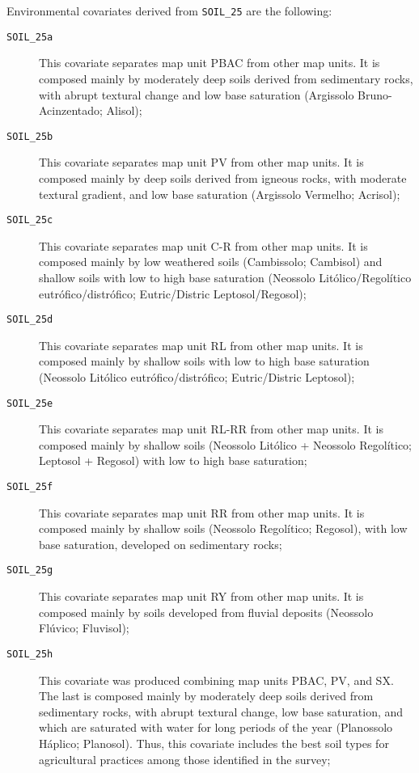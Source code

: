 Environmental covariates derived from \texttt{SOIL\_25} are the following:

\begin{description}
  \item[\texttt{SOIL\_25a}] This covariate separates map unit PBAC from other map units. It is composed mainly by moderately deep soils derived from sedimentary rocks, with abrupt textural change and low base saturation (Argissolo Bruno-Acinzentado; Alisol);

  \item[\texttt{SOIL\_25b}] This covariate separates map unit PV from other map units. It is composed mainly by deep soils derived from igneous rocks, with moderate textural gradient, and low base saturation (Argissolo Vermelho; Acrisol);
 
  \item[\texttt{SOIL\_25c}] This covariate separates map unit C-R from other map units. It is composed mainly by low weathered soils (Cambissolo; Cambisol) and shallow soils with low to high base saturation (Neossolo Litólico/Regolítico eutrófico/distrófico; Eutric/Distric Leptosol/Regosol);
 
  \item[\texttt{SOIL\_25d}] This covariate separates map unit RL from other map units. It is composed mainly by shallow soils with low to high base saturation (Neossolo Litólico eutrófico/distrófico; Eutric/Distric Leptosol);
 
  \item[\texttt{SOIL\_25e}] This covariate separates map unit RL-RR from other map units. It is composed mainly by shallow soils (Neossolo Litólico + Neossolo Regolítico; Leptosol + Regosol) with low to high base saturation;
 
  \item[\texttt{SOIL\_25f}] This covariate separates map unit RR from other map units. It is composed mainly by shallow soils (Neossolo Regolítico; Regosol), with low base saturation, developed on sedimentary rocks;
 
  \item[\texttt{SOIL\_25g}] This covariate separates map unit RY from other map units. It is composed mainly by soils developed from fluvial deposits (Neossolo Flúvico; Fluvisol);
 
  \item[\texttt{SOIL\_25h}] This covariate was produced combining map units PBAC, PV, and SX. The last is composed mainly by moderately deep soils derived from sedimentary rocks, with abrupt textural change, low base saturation, and which are saturated with water for long periods of the year (Planossolo Háplico; Planosol). Thus, this covariate includes the best soil types for agricultural practices among those identified in the survey;
 

\end{description}
